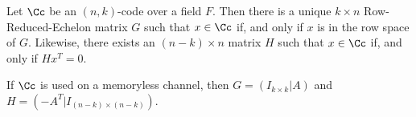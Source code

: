 \begin{theorem}\label{1.1.4}
    Let $\Cc$ be an  $(n,k)$-code over a field $F$. Then there is a unique
    $k \times n$ Row-Reduced-Echelon matrix $G$ such that  $x \in \Cc$ if, and
    only if $x$ is in the row space of $G$. Likewise, there exists an $(n-k)
    \times n$ matrix $H$ such that  $x \in \Cc$ if, and only if $Hx^T=0$.
\end{theorem}
\begin{corollary}
    If $\Cc$ is used on a memoryless channel, then  $G=(I_{k \times k}|A)$ and
    $H=(-A^T|I_{(n-k) \times (n-k)})$.
\end{corollary}
